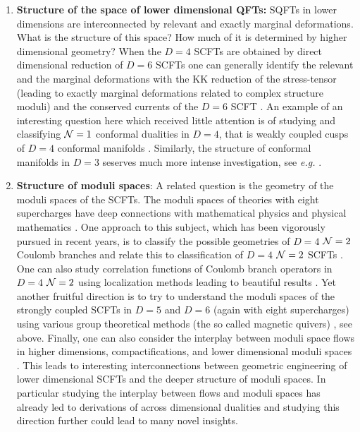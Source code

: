 \documentclass[12pt]{article}
\begin{document}
\begin{enumerate}
 \item  {\bf Structure of the space of lower dimensional QFTs:} SQFTs in lower dimensions are interconnected by  relevant and exactly marginal deformations. What is the structure of this space? 
 How much of it is determined by higher dimensional geometry? When the $D=4$ SCFTs are obtained by direct dimensional reduction of $D=6$ SCFTs one can generally identify the relevant and the marginal deformations with the KK reduction of the stress-tensor (leading to exactly marginal deformations related to complex structure moduli) and the conserved currents of the $D=6$ SCFT \cite{Benini:2009mz,Razamat:2016dpl,Beem:2012yn,babuip}. An example of an interesting question here which received little attention is of studying and classifying ${\cal N}=1$ conformal dualities in $D=4$, that is weakly coupled cusps of $D=4$ conformal manifolds \cite{Razamat:2020pra}. Similarly, the structure of conformal manifolds in $D=3$ seserves much more intense investigation, see {\it e.g.} \cite{Baggio:2017mas,Bachas:2019jaa,Beratto:2020qyk}.
 
 \item {\bf Structure of moduli spaces}: A related question is the geometry of the moduli spaces of the SCFTs. 
 The moduli spaces of theories with eight supercharges have deep connections with mathematical physics and physical mathematics \cite{Seiberg:1994rs,Nekrasov:2002qd}. One approach to this subject, which has been vigorously pursued in recent years, is to classify   the possible geometries of $D=4$ ${\cal N}=2$ Coulomb branches and relate this to classification of $D=4$ ${\cal N}=2$ SCFTs \cite{Argyres:2015ffa,Argyres:2015gha,Argyres:2017tmj,Argyres:2018zay,Argyres:2019ngz,Argyres:2020wmq,Martone:2021ixp}. One can also study correlation functions of Coulomb branch operators in $D=4$ ${\cal N}=2$ using localization methods leading to beautiful results \cite{Gerchkovitz:2016gxx}.
 Yet another fruitful direction is to try to understand the moduli spaces of the strongly coupled SCFTs in $D=5$ and $D=6$ (again with eight supercharges) using various group theoretical methods (the so called magnetic quivers) \cite{Cabrera:2018jxt,Cabrera:2019izd,Bourget:2020asf,vanBeest:2020kou}, see above. Finally, one can also consider the  interplay between moduli space flows in higher dimensions, compactifications, and lower dimensional moduli spaces \cite{Razamat:2019mdt}. This leads to interesting interconnections between geometric engineering of lower dimensional SCFTs and the deeper structure of moduli spaces. In particular studying the interplay between flows and moduli spaces has already led to derivations of across dimensional dualities \cite{Razamat:2019ukg,Etxebarria:2021lmq} and studying this direction further could lead to many  novel insights.  
 


\end{enumerate}
\end{document}
